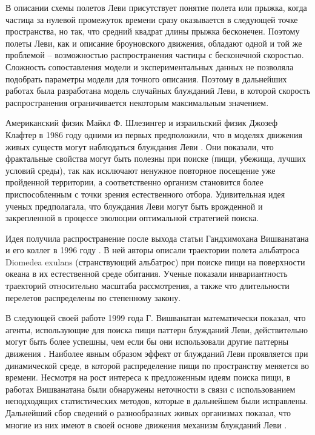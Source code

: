 В описании схемы полетов Леви присутствует понятие полета или прыжка, когда частица за нулевой промежуток времени сразу оказывается в следующей точке пространства, но так, что средний квадрат длины прыжка бесконечен. Поэтому полеты Леви, как и описание броуновского движения, обладают одной и той же проблемой -- возможностью распространения частицы с бесконечной скоростью. Сложность сопоставления модели и экспериментальных данных не позволяла подобрать параметры модели для точного описания. Поэтому в дальнейших работах была разработана модель случайных блужданий Леви, в которой скорость распространения ограничивается некоторым максимальным значением. 

Американский физик Майкл Ф. Шлезингер и израильский физик Джозеф Клафтер в 1986 году одними из первых предположили, что в моделях движения живых существ могут наблюдаться блуждания Леви \cite{shlesinger_levy_1986}. Они показали, что фрактальные свойства могут быть полезны при поиске (пищи, убежища, лучших условий среды), так как исключают ненужное повторное посещение уже пройденной территории, а соответственно организм становится более приспособленным с точки зрения естественного отбора. Удивительная идея ученых предполагала, что блуждания Леви могут быть врожденной и закрепленной в процессе эволюции оптимальной стратегией поиска.

Идея получила распространение после выхода статьи Гандхимохана Вишванатана и его коллег в 1996 году \cite{viswanathan_levy_1996}. В ней авторы описали траектории полета альбатроса Diomedea exulans (странствующий альбатрос) при поиске пищи на поверхности океана в их естественной среде обитания. Ученые показали инвариантность траекторий относительно масштаба рассмотрения, а также что длительности перелетов распределены по степенному закону. 

В следующей своей работе 1999 года Г. Вишванатан математически показал, что агенты, использующие для поиска пищи паттерн блужданий Леви, действительно могут быть более успешны, чем если бы они использовали другие паттерны движения \cite{viswanathan_optimizing_1999}. Наиболее явным образом эффект от блужданий Леви проявляется при динамической среде, в которой распределение пищи по пространству меняется во времени. Несмотря на рост интереса к предложенным идеям поиска пищи, в работах Вишванатана были обнаружены неточности в связи с использованием неподходящих статистических методов, которые в дальнейшем были исправлены. Дальнейший сбор сведений о разнообразных живых организмах показал, что многие из них имеют в своей основе движения механизм блужданий Леви \cite{zaburdaev_levy_2015}.

